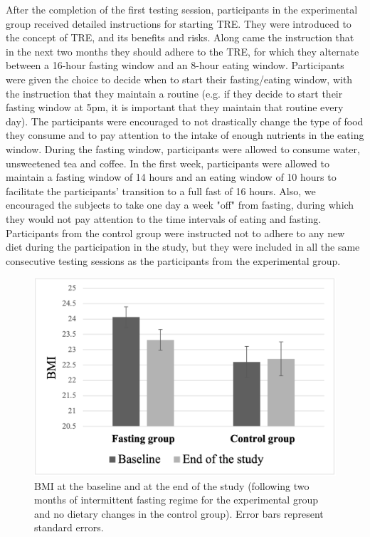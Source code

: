 \documentclass[authordate, empirical]{jote-new-article}
\begin{document}
After the completion of the first testing session, participants in the experimental group received detailed instructions for starting TRE. They were introduced to the concept of TRE, and its benefits and risks. Along came the instruction that in the next two months they should adhere to the TRE, for which they alternate between a 16-hour fasting window and an 8-hour eating window. Participants were given the choice to decide when to start their fasting/eating window, with the instruction that they maintain a routine (e.g. if they decide to start their fasting window at 5pm, it is important that they maintain that routine every day). The participants were encouraged to not drastically change the type of food they consume and to pay attention to the intake of enough nutrients in the eating window. During the fasting window, participants were allowed to consume water, unsweetened tea and coffee. In the first week, participants were allowed to maintain a fasting window of 14 hours and an eating window of 10 hours to facilitate the participants' transition to a full fast of 16 hours. Also, we encouraged the subjects to take one day a week "off" from fasting, during which they would not pay attention to the time intervals of eating and fasting. Participants from the control group were instructed not to adhere to any new diet during the participation in the study, but they were included in all the same consecutive testing sessions as the participants from the experimental group.


\begin{figure}
  \begin{fullwidth}
    \includegraphics[width=\linewidth]{media/image2.png}
    \caption{BMI at the baseline and at the end of the study (following two months of intermittent fasting regime for the experimental group and no dietary changes in the control group). Error bars represent standard errors.}

  \end{fullwidth}
\end{figure}
\end{document}
